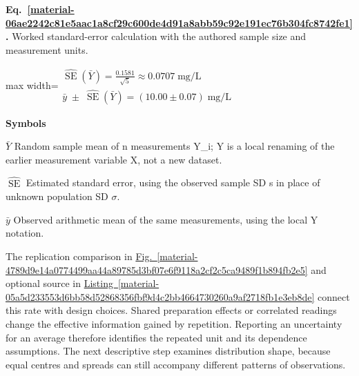 \documentclass[11pt,a4paper]{article}
\begin{document}
\par\medskip
\noindent\begin{minipage}{\linewidth}
\label{material-06ae2242c81e5aac1a8cf29c600de4d91a8abb59c92e191ec76b304fc8742fe1}
\noindent\textbf{Eq.~\ref*{material-06ae2242c81e5aac1a8cf29c600de4d91a8abb59c92e191ec76b304fc8742fe1}.} Worked standard-error calculation with the authored sample size and measurement units.\par\nopagebreak
\begin{center}\begin{adjustbox}{max width=\linewidth}$\displaystyle \begin{gathered}\widehat{\operatorname{SE}}(\bar Y)=\frac{0.1581}{\sqrt5}\approx0.0707\;\mathrm{mg/L}\\\boxed{\bar y\;\pm\;\widehat{\operatorname{SE}}(\bar Y)=(10.00\pm0.07)\;\mathrm{mg/L}}\end{gathered}$\end{adjustbox}\end{center}

\par\noindent\textbf{Symbols}

\par\noindent\textbf{\(\bar Y\)} Random sample mean of n measurements Y\_i; Y is a local renaming of the earlier measurement variable X, not a new dataset.

\par\noindent\textbf{\(\widehat{\operatorname{SE}}\)} Estimated standard error, using the observed sample SD s in place of unknown population SD \ensuremath{\sigma}.

\par\noindent\textbf{\(\bar y\)} Observed arithmetic mean of the same measurements, using the local Y notation.

\end{minipage}\par
\medskip

The replication comparison in \hyperref[material-4789d9e14a0774499aa44a89785d3bf07e6f9118a2cf2c5ca9489f1b894fb2e5]{Fig.~\ref*{material-4789d9e14a0774499aa44a89785d3bf07e6f9118a2cf2c5ca9489f1b894fb2e5}} and optional source in \hyperref[material-05a5d233553d6bb58d52868356fbf9d4c2bb4664730260a9af2718fb1e3eb8de]{Listing~\ref*{material-05a5d233553d6bb58d52868356fbf9d4c2bb4664730260a9af2718fb1e3eb8de}} connect this rate with design choices. Shared preparation effects or correlated readings change the effective information gained by repetition. Reporting an uncertainty for an average therefore identifies the repeated unit and its dependence assumptions. The next descriptive step examines distribution shape, because equal centres and spreads can still accompany different patterns of observations.
\end{document}

